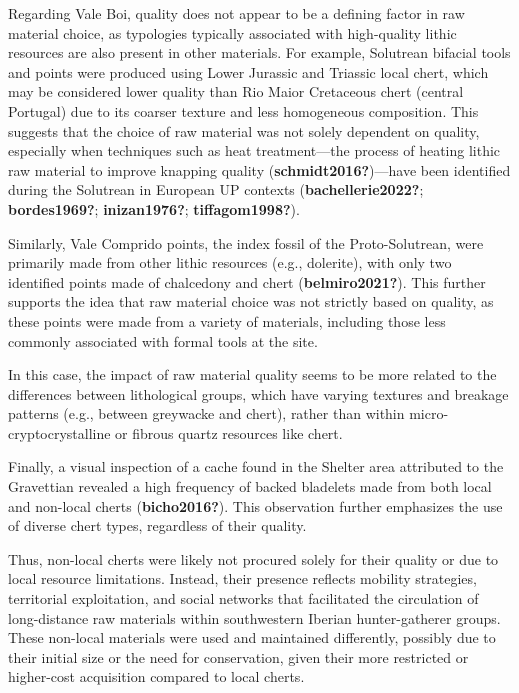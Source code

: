 \documentclass[
  a4paper,
  DIV=11,
  numbers=noendperiod]{scrreprt}
\begin{document}
Regarding Vale Boi, quality does not appear to be a defining factor in
raw material choice, as typologies typically associated with
high-quality lithic resources are also present in other materials. For
example, Solutrean bifacial tools and points were produced using Lower
Jurassic and Triassic local chert, which may be considered lower quality
than Rio Maior Cretaceous chert (central Portugal) due to its coarser
texture and less homogeneous composition. This suggests that the choice
of raw material was not solely dependent on quality, especially when
techniques such as heat treatment---the process of heating lithic raw
material to improve knapping quality (\textbf{schmidt2016?})---have been
identified during the Solutrean in European UP contexts
(\textbf{bachellerie2022?}; \textbf{bordes1969?}; \textbf{inizan1976?};
\textbf{tiffagom1998?}).

Similarly, Vale Comprido points, the index fossil of the
Proto-Solutrean, were primarily made from other lithic resources (e.g.,
dolerite), with only two identified points made of chalcedony and chert
(\textbf{belmiro2021?}). This further supports the idea that raw
material choice was not strictly based on quality, as these points were
made from a variety of materials, including those less commonly
associated with formal tools at the site.

In this case, the impact of raw material quality seems to be more
related to the differences between lithological groups, which have
varying textures and breakage patterns (e.g., between greywacke and
chert), rather than within micro-cryptocrystalline or fibrous quartz
resources like chert.

Finally, a visual inspection of a cache found in the Shelter area
attributed to the Gravettian revealed a high frequency of backed
bladelets made from both local and non-local cherts
(\textbf{bicho2016?}). This observation further emphasizes the use of
diverse chert types, regardless of their quality.

Thus, non-local cherts were likely not procured solely for their quality
or due to local resource limitations. Instead, their presence reflects
mobility strategies, territorial exploitation, and social networks that
facilitated the circulation of long-distance raw materials within
southwestern Iberian hunter-gatherer groups. These non-local materials
were used and maintained differently, possibly due to their initial size
or the need for conservation, given their more restricted or higher-cost
acquisition compared to local cherts.
\end{document}
